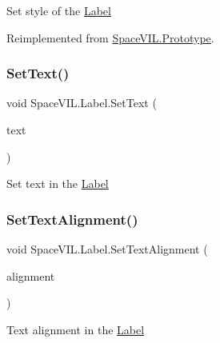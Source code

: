 Set style of the \mbox{\hyperlink{class_space_v_i_l_1_1_label}{Label}} 



Reimplemented from \mbox{\hyperlink{class_space_v_i_l_1_1_prototype_ae96644a6ace490afb376fb542161e541}{Space\+V\+I\+L.\+Prototype}}.

\mbox{\label{class_space_v_i_l_1_1_label_a7f6a0dc0e3f9b9a00140f099ff81f8db}} 
\subsubsection{\texorpdfstring{Set\+Text()}{SetText()}}
{\footnotesize\ttfamily void Space\+V\+I\+L.\+Label.\+Set\+Text (\begin{DoxyParamCaption}\item[{String}]{text }\end{DoxyParamCaption})\hspace{0.3cm}{\ttfamily [inline]}}



Set text in the \mbox{\hyperlink{class_space_v_i_l_1_1_label}{Label}} 

\mbox{\label{class_space_v_i_l_1_1_label_a0f5fc3700bd8979d9760bd8ba424db04}} 
\subsubsection{\texorpdfstring{Set\+Text\+Alignment()}{SetTextAlignment()}}
{\footnotesize\ttfamily void Space\+V\+I\+L.\+Label.\+Set\+Text\+Alignment (\begin{DoxyParamCaption}\item[{Item\+Alignment}]{alignment }\end{DoxyParamCaption})\hspace{0.3cm}{\ttfamily [inline]}}



Text alignment in the \mbox{\hyperlink{class_space_v_i_l_1_1_label}{Label}} 

\mbox{\label{class_space_v_i_l_1_1_label_ada348a70497547222a0f5d43d0e8b401}} 
